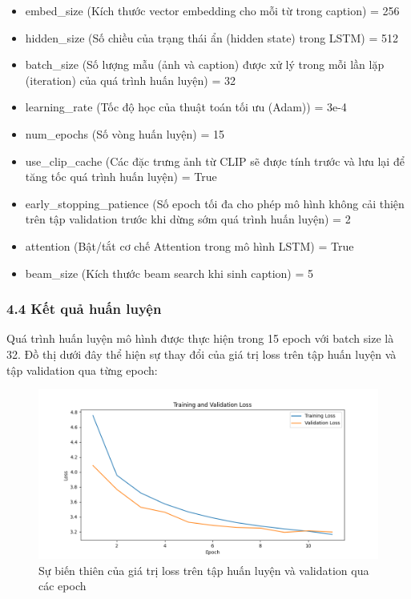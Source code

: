 \documentclass[../main.tex]{subfiles}
\begin{document}
\begin{itemize}
    \item embed\_size (Kích thước vector embedding cho mỗi từ trong caption) = 256
    \item hidden\_size (Số chiều của trạng thái ẩn (hidden state) trong LSTM) = 512
    \item batch\_size (Số lượng mẫu (ảnh và caption) được xử lý trong mỗi lần lặp (iteration) của quá trình huấn luyện) = 32
    \item learning\_rate (Tốc độ học của thuật toán tối ưu (Adam)) = 3e-4
    \item num\_epochs  (Số vòng huấn luyện) = 15
    \item use\_clip\_cache (Các đặc trưng ảnh từ CLIP sẽ được tính trước và lưu lại để tăng tốc quá trình huấn luyện) = True
    \item early\_stopping\_patience (Số epoch tối đa cho phép mô hình không cải thiện trên tập validation trước khi dừng sớm quá trình huấn luyện) = 2
    \item attention (Bật/tắt cơ chế Attention trong mô hình LSTM) = True
    \item beam\_size (Kích thước beam search khi sinh caption) = 5
\end{itemize}

\subsubsection*{4.4 Kết quả huấn luyện}

Quá trình huấn luyện mô hình được thực hiện trong 15 epoch với batch size là 32. Đồ thị dưới đây thể hiện sự thay đổi của giá trị loss trên tập huấn luyện và tập validation qua từng epoch:

\begin{figure}[H]
    \centering
    \includegraphics[width=1\textwidth]{Image/loss_plot.png}
    \caption{Sự biến thiên của giá trị loss trên tập huấn luyện và validation qua các epoch}
    \label{fig:loss}
\end{figure}
\end{document}
